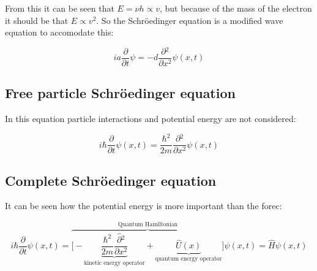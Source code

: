From this it can be seen that $E=\nu h\propto v$, but because of the mass of the electron it should be that $E\propto v^2$.
So the Schr\"oedinger equation is a modified wave equation to accomodate this:

$$ia \frac{\partial {}}{\partial {t}}\psi=-d \frac{\partial {^2}}{\partial {x^2}}\psi(x,t)$$

  \subsection{Free particle Schr\"oedinger equation}
  In this equation particle interactions and potential energy are not considered:

  $$i\hbar \frac{\partial {}}{\partial {t}}\psi(x,t) = \frac{\hbar^2}{2m}\frac{\partial {^2}}{\partial {x^2}}\psi(x,t)$$

  \subsection{Complete Schr\"oedinger equation}
  It can be seen how the potential energy is more important than the forec:

  $$i\hbar \frac{\partial {}}{\partial {t}}\psi(x,t) = \overbrace{\biggl[-\underbrace{\frac{\hbar^2}{2m}\frac{\hat{\partial} {^2}}{\partial {x^2}}}_{\text{kinetic energy operator}}+\underbrace{\hat{U}(x)}_{\text{quantum energy operator}}\biggr]}^{\text{Quantum Hamiltonian}}\psi(x,t) = \hat{H}\psi(x,t)$$
